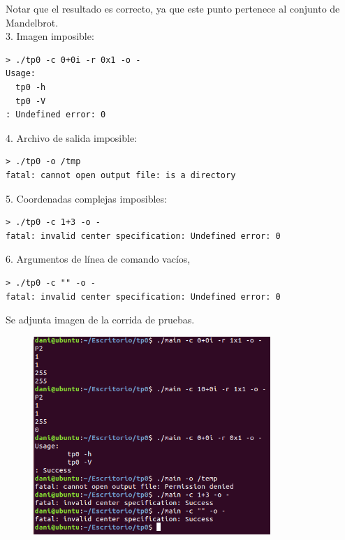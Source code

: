 \documentclass[a4paper,10pt]{article}
\begin{document}
Notar que el resultado es correcto, ya que este punto pertenece al conjunto de Mandelbrot.
\\
3. Imagen imposible:
\begin{verbatim}
> ./tp0 -c 0+0i -r 0x1 -o -
Usage:
  tp0 -h
  tp0 -V
: Undefined error: 0
\end{verbatim}


4. Archivo de salida imposible:
\begin{verbatim}
> ./tp0 -o /tmp
fatal: cannot open output file: is a directory
\end{verbatim}


5. Coordenadas complejas imposibles:
\begin{verbatim}
> ./tp0 -c 1+3 -o -
fatal: invalid center specification: Undefined error: 0
\end{verbatim}


6. Argumentos de l\'inea de comando vac\'ios,
\begin{verbatim}
> ./tp0 -c "" -o -
fatal: invalid center specification: Undefined error: 0
\end{verbatim}


Se adjunta imagen de la corrida de pruebas.
\begin{figure}
  \begin{center}
    \includegraphics[width=0.8\textwidth]{./Pruebas.png}
    \label{fig:Resultado de correr los casos de prueba antes mencionados}
    \caption{}
  \end{center}
\end{figure}
\end{document}
